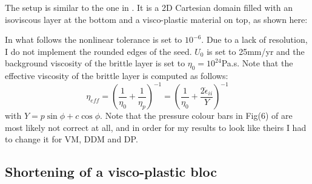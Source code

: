 The setup is similar to the one in \cite{spmw16}. It is a 2D Cartesian domain filled with an 
isoviscous layer at the bottom and a visco-plastic material on top, as shown here:  



In what follows the nonlinear tolerance is set to $10^{-6}$. Due to a lack of resolution, I do not
implement the rounded edges of the seed. $U_0$ is set to 25mm/yr and the background viscosity of the brittle layer
is set to $\eta_0=10^{24}$Pa.s. Note that the effective viscosity of the brittle layer is computed as follows:
\[
\eta_{eff}
=\left( \frac{1}{\eta_0} + \frac{1}{\eta_p}  \right)^{-1}
=\left( \frac{1}{\eta_0} + \frac{2 \dot{\epsilon}_{ii}}{Y}  \right)^{-1}
\]
with $Y=p \sin \phi + c \cos \phi$. 
Note that the pressure colour bars in Fig(6) of \cite{spmw16} are most likely not correct at all, 
and in order for my results to look like theirs I had to change it for VM, DDM and DP. 







\newpage
\subsection*{Shortening of a visco-plastic bloc}

